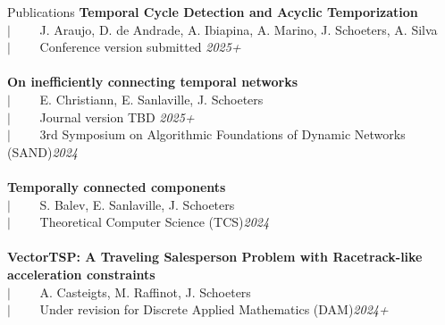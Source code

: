 \documentclass[french]{resume} %
\begin{document}
	\newpage
	\begin{rSection}{Publications }
		{\bf Temporal Cycle Detection and Acyclic Temporization}\\
		$| \qquad$ J. Araujo, D. de Andrade, A. Ibiapina, A. Marino, J. Schoeters, A. Silva\\
		$| \qquad$ Conference version submitted \hfill {\em 2025+}
		\\
		\\
		{\bf On inefficiently connecting temporal networks}\\
		$| \qquad$ E. Christiann, E. Sanlaville, J. Schoeters\\
		$| \qquad$ Journal version TBD \hfill {\em 2025+}\\
		$| \qquad$ 3rd Symposium on Algorithmic Foundations of Dynamic Networks (SAND)\hfill {\em 2024}
		\\
		\\
		{\bf Temporally connected components}\\
		$| \qquad$ S. Balev, E. Sanlaville, J. Schoeters\\
		$| \qquad$ Theoretical Computer Science (TCS)\hfill {\em 2024}
		\\
		\\
		{\bf VectorTSP: A Traveling Salesperson Problem with Racetrack-like acceleration constraints}\\
		$| \qquad$ A. Casteigts, M. Raffinot, J. Schoeters\\
		$| \qquad$ Under revision for Discrete Applied Mathematics (DAM)\hfill {\em 2024+}\\

\end{rSection}
\end{document}
